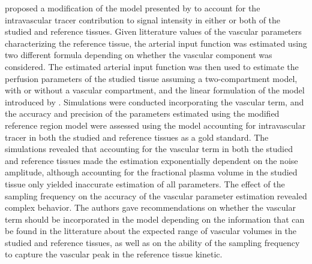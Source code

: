 \citet{Faranesh:2008tt} proposed a modification of the model presented by \citet{Yankeelov:2005dea} to account for the intravascular tracer contribution to signal intensity in either or both of the studied and reference tissues.
Given litterature values of the vascular parameters characterizing the reference tissue, the arterial input function was estimated using two different formula depending on whether the vascular component was considered.
The estimated arterial input function was then used to estimate the perfusion parameters of the studied tissue assuming a two-compartment model, with or without a vascular compartment, and the linear formulation of the model introduced by \citet{Murase:2004kr}.
Simulations were conducted incorporating the vascular term, and the accuracy and precision of the parameters estimated using the modified reference region model were assessed using the model accounting for intravascular tracer in both the studied and reference tissues as a gold standard.
The simulations revealed that accounting for the vascular term in both the studied and reference tissues made the estimation exponentially dependent on the noise amplitude, although accounting for the fractional plasma volume in the studied tissue only yielded inaccurate estimation of all parameters.
The effect of the sampling frequency on the accuracy of the vascular parameter estimation revealed complex behavior.
The authors gave recommendations on whether the vascular term should be incorporated in the model depending on the information that can be found in the litterature about the expected range of vascular volumes in the studied and reference tissues, as well as on the ability of the sampling frequency to capture the vascular peak in the reference tissue kinetic.


